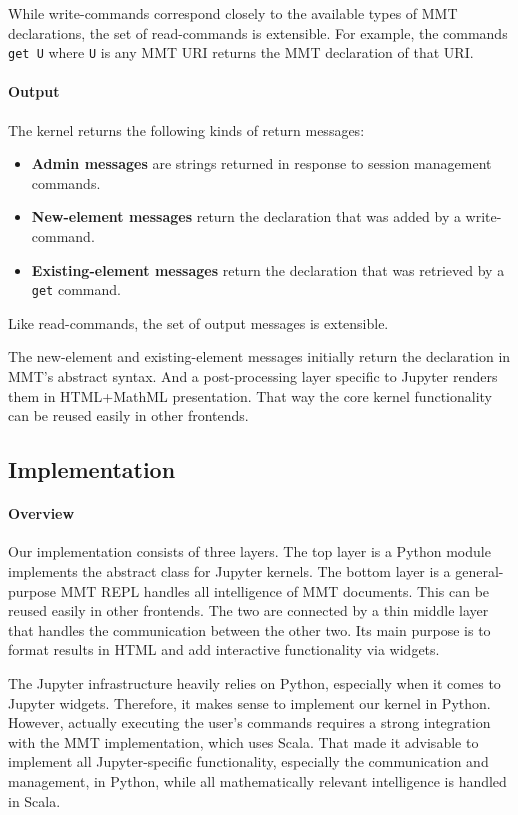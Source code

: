 While write-commands correspond closely to the available types of MMT declarations, the set of read-commands is extensible.
For example, the commands \texttt{get U} where \texttt{U} is any MMT URI returns the MMT declaration of that URI.

\paragraph{Output}
The kernel returns the following kinds of return messages:
\begin{itemize}
\item \textbf{Admin messages} are strings returned in response to session management commands.
\item \textbf{New-element messages} return the declaration that was added by a write-command.
\item \textbf{Existing-element messages} return the declaration that was retrieved by a \texttt{get} command.
\end{itemize}
Like read-commands, the set of output messages is extensible.

The new-element and existing-element messages initially return the declaration in MMT's abstract syntax.
And a post-processing layer specific to Jupyter renders them in HTML+MathML presentation.
That way the core kernel functionality can be reused easily in other frontends.

\subsection{Implementation}\label{sec:kernel:impl}

\paragraph{Overview}
Our implementation consists of three layers.
The top layer is a Python module implements the abstract class for Jupyter kernels.
The bottom layer is a general-purpose MMT REPL handles all intelligence of MMT documents.
This can be reused easily in other frontends.
The two are connected by a thin middle layer that handles the communication between the other two.
Its main purpose is to format results in HTML and add interactive functionality via widgets.

The Jupyter infrastructure heavily relies on Python, especially when it comes to Jupyter widgets.
Therefore, it makes sense to implement our kernel in Python.
However, actually executing the user's commands requires a strong integration with the MMT implementation, which uses Scala.
That made it advisable to implement all Jupyter-specific functionality, especially the communication and management, in Python, while all mathematically relevant intelligence is handled in Scala.

